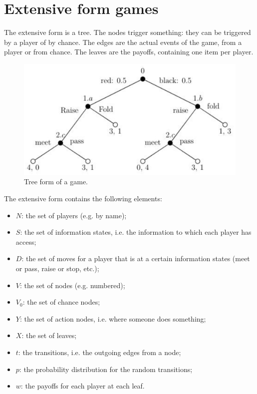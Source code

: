 \documentclass[12pt, openany]{report}
\theoremstyle{definition}
\begin{document}
\section{Extensive form games}
The extensive form is a tree. The nodes trigger something: they can be triggered by a player of by chance. The edges are the actual events of the game, from a player or from chance. The leaves are the payoffs, containing one item per player. 
\begin{figure}[H]
  \centering 
  \includegraphics[scale=.15]{img/extensive.png}
  \caption{Tree form of a game.}
  \label{fig:tree}
\end{figure}
The extensive form contains the following elements:
\begin{itemize}
	\item $N$: the set of players (e.g. by name);
	\item $S$: the set of information states, i.e. the information to which each player has access;
	\item $D$: the set of moves for a player that is at a certain information states (meet or pass, raise or stop, etc.);
	\item $V$: the set of nodes (e.g. numbered);
	\item $V_0$: the set of chance nodes;
	\item $Y$: the set of action nodes, i.e. where someone does something;
	\item $X$: the set of leaves;
	\item $t$: the transitions, i.e. the outgoing edges from a node;
	\item $p$: the probability distribution for the random transitions;
	\item $w$: the payoffs for each player at each leaf.
\end{itemize}
\end{document}
